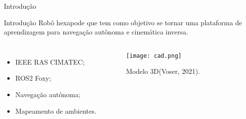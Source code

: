 \begin{frame}[c]{Introdução} 
    \transdissolve[duration=0.5]
   
    \begin{center}
    \end{center}
    
\end{frame}

\begin{frame}[t]{Introdução} 
    \transdissolve[duration=0.5]
    Robô hexapode que tem como objetivo se tornar uma plataforma de aprendizagem para navegação autônoma e cinemática inversa.
        \begin{columns}[t]
                \begin{itemize}
                    \item IEEE RAS CIMATEC;
                    \item ROS2 Foxy;
                    \item Navegação autônoma;
                    \item Mapeamento de ambientes.
                \end{itemize}
            \begin{center}
                \begin{figure}
                    \texttt{[image: cad.png]}
                    \caption{Modelo 3D(Voser, 2021).}
                \end{figure}
            \end{center}
        \end{columns}
\end{frame}


